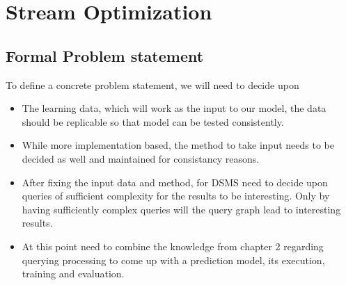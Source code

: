 \chapter{Stream Optimization}
\label{chapter:stream_optimization}
\thispagestyle{myheadings}

\graphicspath{{3_Conclusion/Figures/}}

\section{Formal Problem statement}
To define a concrete problem statement, we will need to decide upon
\begin{itemize}
    \item The learning data, which will work as the input to our model, the data should be replicable so that model can be tested consistently.
    \item While more implementation based, the method to take input needs to be decided as well and maintained for consistancy reasons.
    \item After fixing the input data and method, for DSMS need to decide upon queries of sufficient complexity for the results to be interesting. Only by having sufficiently complex queries will the query graph lead to interesting results.
    \item At this point need to combine the knowledge from chapter 2 regarding querying processing to come up with a prediction model, its execution, training and evaluation.

\end{itemize}
